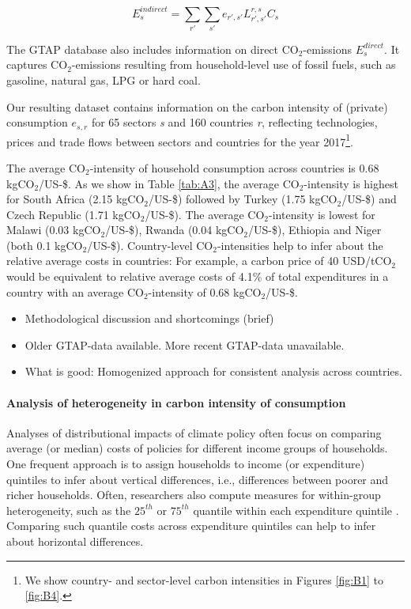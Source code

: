 \documentclass[12pt, a4paper]{article}
\begin{document}
\begin{equation}
    E_{s}^{indirect} = \sum_{r'} \sum_{s'} e_{r',s'} L_{r',s'}^{r,s} C_{s}
\end{equation}

The GTAP database also includes information on direct CO$_{2}$-emissions $E_{s}^{direct}$. It captures CO$_{2}$-emissions resulting from household-level use of fossil fuels, such as gasoline, natural gas, LPG or hard coal.

Our resulting dataset contains information on the carbon intensity of (private) consumption $e_{s,r}$ for 65 sectors \textit{s} and 160 countries \textit{r}, reflecting technologies, prices and trade flows between sectors and countries for the year 2017\footnote{We show country- and sector-level carbon intensities in Figures \ref{fig:B1} to \ref{fig:B4}.}.


The average CO$_{2}$-intensity of household consumption across countries is 0.68 kgCO$_{2}$/US-\$. As we show in Table \ref{tab:A3}, the average CO$_{2}$-intensity is highest for South Africa (2.15 kgCO$_{2}$/US-\$) followed by Turkey (1.75 kgCO$_{2}$/US-\$) and Czech Republic (1.71 kgCO$_{2}$/US-\$). The average CO$_{2}$-intensity is lowest for Malawi (0.03 kgCO$_{2}$/US-\$), Rwanda (0.04 kgCO$_{2}$/US-\$), Ethiopia and Niger (both 0.1 kgCO$_{2}$/US-\$). Country-level CO$_{2}$-intensities help to infer about the relative average costs in countries: For example, a carbon price of 40 USD/tCO$_{2}$ \autocite{Stiglitz.2017} would be equivalent to relative average costs of 4.1\% of total expenditures in a country with an average CO$_{2}$-intensity of 0.68 kgCO$_{2}$/US-\$.

\begin{itemize}
    \item Methodological discussion and shortcomings (brief)
    \item Older GTAP-data available. More recent GTAP-data unavailable.
    \item What is good: Homogenized approach for consistent analysis across countries.
\end{itemize}

\paragraph{Analysis of heterogeneity in carbon intensity of consumption}

Analyses of distributional impacts of climate policy often focus on comparing average (or median) costs of policies for different income groups of households. One frequent approach is to assign households to income (or expenditure) quintiles to infer about vertical differences, i.e., differences between poorer and richer households. Often, researchers also compute measures for within-group heterogeneity, such as the $25^{th}$ or $75^{th}$ quantile within each expenditure quintile \autocite{Cronin.2019, Missbach.2023b}. Comparing such quantile costs across expenditure quintiles can help to infer about horizontal differences.
\end{document}

